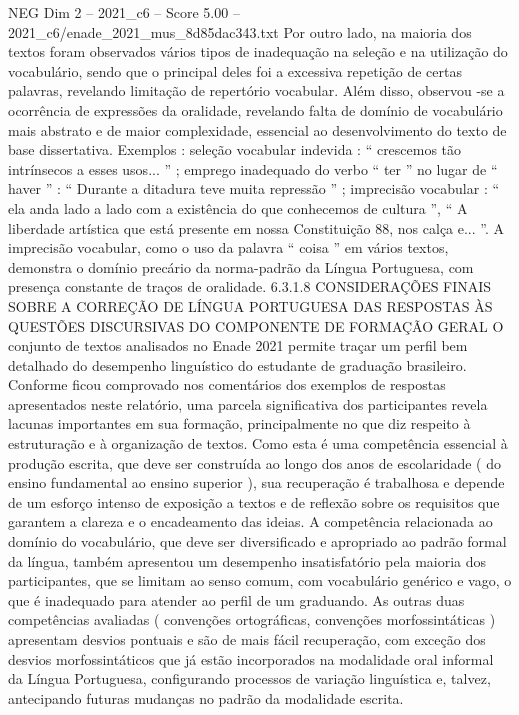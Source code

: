 \begin{textsample}{NEG Dim 2 – 2021\_c6 – Score 5.00 – 2021\_c6/enade\_2021\_mus\_8d85dac343.txt}
Por outro lado, na maioria dos textos foram observados vários tipos de inadequação na seleção e na utilização do vocabulário, sendo que o principal deles foi a excessiva repetição de certas palavras, revelando limitação de repertório vocabular.
Além disso, observou -se a ocorrência de expressões da oralidade, revelando falta de domínio de vocabulário mais abstrato e de maior complexidade, essencial ao desenvolvimento do texto de base dissertativa.
Exemplos : seleção vocabular indevida : “ crescemos tão intrínsecos a esses usos... ” ; emprego inadequado do verbo “ ter ” no lugar de “ haver ” : “ Durante a ditadura teve muita repressão ” ; imprecisão vocabular : “ ela anda lado a lado com a existência do que conhecemos de cultura ”, “ A liberdade artística que está presente em nossa Constituição 88, nos calça e... ”.
A imprecisão vocabular, como o uso da palavra “ coisa ” em vários textos, demonstra o domínio precário da norma-padrão da Língua Portuguesa, com presença constante de traços de oralidade. 6.3.1.8 CONSIDERAÇÕES FINAIS SOBRE A CORREÇÃO DE LÍNGUA PORTUGUESA DAS RESPOSTAS ÀS QUESTÕES DISCURSIVAS DO COMPONENTE DE FORMAÇÃO GERAL O conjunto de textos analisados no Enade 2021 permite traçar um perfil bem detalhado do desempenho linguístico do estudante de graduação brasileiro.
Conforme ficou comprovado nos comentários dos exemplos de respostas apresentados neste relatório, uma parcela significativa dos participantes revela lacunas importantes em sua formação, principalmente no que diz respeito à estruturação e à organização de textos.
Como esta é uma competência essencial à produção escrita, que deve ser construída ao longo dos anos de escolaridade ( do ensino fundamental ao ensino superior ), sua recuperação é trabalhosa e depende de um esforço intenso de exposição a textos e de reflexão sobre os requisitos que garantem a clareza e o encadeamento das ideias.
A competência relacionada ao domínio do vocabulário, que deve ser diversificado e apropriado ao padrão formal da língua, também apresentou um desempenho insatisfatório pela maioria dos participantes, que se limitam ao senso comum, com vocabulário genérico e vago, o que é inadequado para atender ao perfil de um graduando.
As outras duas competências avaliadas ( convenções ortográficas, convenções morfossintáticas ) apresentam desvios pontuais e são de mais fácil recuperação, com exceção dos desvios morfossintáticos que já estão incorporados na modalidade oral informal da Língua Portuguesa, configurando processos de variação linguística e, talvez, antecipando futuras mudanças no padrão da modalidade escrita.

\end{textsample}
